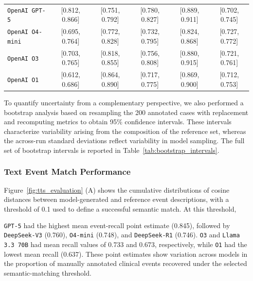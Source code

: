 \documentclass[pdflatex,sn-mathphys-num]{sn-jnl}%
\newif\ifshowrebuttalcolor
\newcommand{\rebuttal}[1]{%
  \ifshowrebuttalcolor
    \textcolor{rebuttalblue}{#1}%
  \else
    #1%
  \fi
}
\theoremstyle{thmstyleone}%
\theoremstyle{thmstyletwo}%
\theoremstyle{thmstylethree}%
\begin{document}
\begin{table}[ht!]
\begin{tabular}{lccccc}
\texttt{OpenAI GPT-5}
& [0.812, 0.866]
& [0.751, 0.792]
& [0.780, 0.827]
& [0.889, 0.911]
& [0.702, 0.745] \\

\texttt{OpenAI O4-mini}
& [0.695, 0.764]
& [0.772, 0.828]
& [0.732, 0.795]
& [0.824, 0.868]
& [0.727, 0.772] \\

\texttt{OpenAI O3}
& [0.703, 0.765]
& [0.818, 0.855]
& [0.756, 0.808]
& [0.880, 0.915]
& [0.721, 0.761] \\

\texttt{OpenAI O1}
& [0.612, 0.686]
& [0.864, 0.890]
& [0.717, 0.775]
& [0.869, 0.900]
& [0.712, 0.753] \\
\hline
\end{tabular}
\vspace{-3.5mm}
\end{table}


To quantify uncertainty from a complementary perspective, we also performed a bootstrap analysis based on resampling the 200 annotated cases with replacement and recomputing metrics to obtain 95\% confidence intervals. These intervals characterize variability arising from the composition of the reference set, whereas the across-run standard deviations reflect variability in model sampling. The full set of bootstrap intervals is reported in Table~\ref{tab:bootstrap_intervals}.




\subsubsection{Text Event Match Performance}
\label{sec:text-event-match-performance}
Figure~\ref{fig:tts_evaluation} (A) shows the cumulative distributions of cosine distances between model-generated and reference event descriptions, with a threshold of 0.1 used to define a successful semantic match. At this threshold, 
\rebuttal{
\texttt{GPT-5} had the highest mean event-recall point estimate (0.845), followed by \texttt{DeepSeek-V3} (0.760), \texttt{O4-mini} (0.748), and \texttt{DeepSeek-R1} (0.746). \texttt{O3} and \texttt{Llama 3.3 70B} had mean recall values of 0.733 and 0.673, respectively, while \texttt{O1} had the lowest mean recall (0.637). These point estimates show variation across models in the proportion of manually annotated clinical events recovered under the selected semantic-matching threshold.
}
\end{document}
